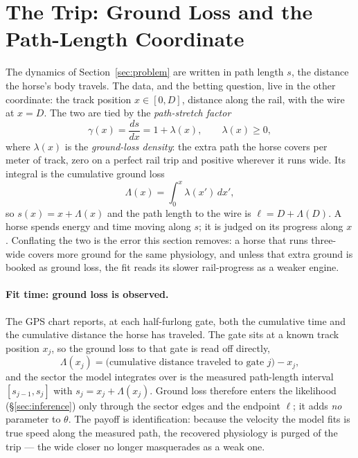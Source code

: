 \documentclass[11pt]{article}
\begin{document}
\section{The Trip: Ground Loss and the Path-Length Coordinate}\label{sec:trip}

The dynamics of Section~\ref{sec:problem} are written in path length $s$, the distance the horse's body travels. The data, and the betting question, live in the other coordinate: the track position $x \in [0, D]$, distance along the rail, with the wire at $x = D$. The two are tied by the \emph{path-stretch factor}
\begin{equation}
\gamma(x) = \frac{ds}{dx} = 1 + \lambda(x), \qquad \lambda(x) \geq 0,
\end{equation}
where $\lambda(x)$ is the \emph{ground-loss density}: the extra path the horse covers per meter of track, zero on a perfect rail trip and positive wherever it runs wide. Its integral is the cumulative ground loss
\begin{equation}
\Lambda(x) = \int_0^x \lambda(x')\, dx',
\end{equation}
so $s(x) = x + \Lambda(x)$ and the path length to the wire is $\ell = D + \Lambda(D)$. A horse spends energy and time moving along $s$; it is judged on its progress along $x$. Conflating the two is the error this section removes: a horse that runs three-wide covers more ground for the same physiology, and unless that extra ground is booked as ground loss, the fit reads its slower rail-progress as a weaker engine.

\paragraph{Fit time: ground loss is observed.} The GPS chart reports, at each half-furlong gate, both the cumulative time and the cumulative distance the horse has traveled. The gate sits at a known track position $x_j$, so the ground loss to that gate is read off directly,
\begin{equation}
\Lambda(x_j) = \big(\text{cumulative distance traveled to gate } j\big) - x_j,
\end{equation}
and the sector the model integrates over is the measured path-length interval $[s_{j-1}, s_j]$ with $s_j = x_j + \Lambda(x_j)$. Ground loss therefore enters the likelihood (\S\ref{sec:inference}) only through the sector edges and the endpoint $\ell$; it adds \emph{no} parameter to $\theta$. The payoff is identification: because the velocity the model fits is true speed along the measured path, the recovered physiology is purged of the trip --- the wide closer no longer masquerades as a weak one.
\end{document}
